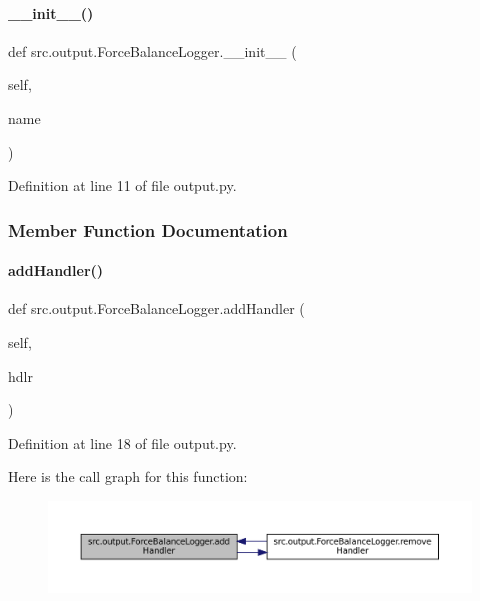 \paragraph{\texorpdfstring{\+\_\+\+\_\+init\+\_\+\+\_\+()}{\_\_init\_\_()}}
{\footnotesize\ttfamily def src.\+output.\+Force\+Balance\+Logger.\+\_\+\+\_\+init\+\_\+\+\_\+ (\begin{DoxyParamCaption}\item[{}]{self,  }\item[{}]{name }\end{DoxyParamCaption})}



Definition at line 11 of file output.\+py.



\subsubsection{Member Function Documentation}
\mbox{\label{classsrc_1_1output_1_1ForceBalanceLogger_a81672b6c5dfd96e11a73c6c345533d1f}} 
\paragraph{\texorpdfstring{add\+Handler()}{addHandler()}}
{\footnotesize\ttfamily def src.\+output.\+Force\+Balance\+Logger.\+add\+Handler (\begin{DoxyParamCaption}\item[{}]{self,  }\item[{}]{hdlr }\end{DoxyParamCaption})}



Definition at line 18 of file output.\+py.

Here is the call graph for this function\+:
\nopagebreak
\begin{figure}[H]
\begin{center}
\leavevmode
\includegraphics[width=350pt]{classsrc_1_1output_1_1ForceBalanceLogger_a81672b6c5dfd96e11a73c6c345533d1f_cgraph}
\end{center}
\end{figure}
\mbox{\label{classsrc_1_1output_1_1ForceBalanceLogger_a8be21b79e392b07a93e1718be22b437c}} 
